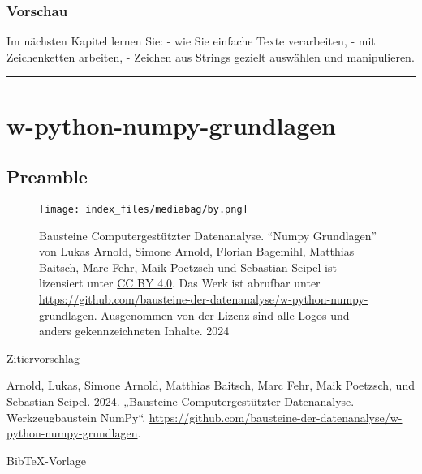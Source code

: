 \documentclass[
  letterpaper,
  DIV=11,
  numbers=noendperiod]{scrreprt}
\begin{document}
\begin{tcolorbox}
\section{Vorschau}\label{vorschau-1}

Im nächsten Kapitel lernen Sie: - wie Sie einfache Texte verarbeiten, -
mit Zeichenketten arbeiten, - Zeichen aus Strings gezielt auswählen und
manipulieren.

\begin{center}\rule{0.5\linewidth}{0.5pt}\end{center}

\part{w-python-numpy-grundlagen}

\chapter*{Preamble}\label{preamble}


\label{Lizenz}
\begin{figure}

\begin{minipage}{0.20\linewidth}
\texttt{[image: index\_files/mediabag/by.png]}\end{minipage}%
%
\begin{minipage}{0.80\linewidth}
Bausteine Computergestützter Datenanalyse. ``Numpy Grundlagen'' von
Lukas Arnold, Simone Arnold, Florian Bagemihl, Matthias Baitsch, Marc
Fehr, Maik Poetzsch und Sebastian Seipel ist lizensiert unter
\href{https://creativecommons.org/licenses/by/4.0/deed.de}{CC BY 4.0}.
Das Werk ist abrufbar unter
\url{https://github.com/bausteine-der-datenanalyse/w-python-numpy-grundlagen}.
Ausgenommen von der Lizenz sind alle Logos und anders gekennzeichneten
Inhalte. 2024\end{minipage}%

\end{figure}%

Zitiervorschlag

Arnold, Lukas, Simone Arnold, Matthias Baitsch, Marc Fehr, Maik
Poetzsch, und Sebastian Seipel. 2024. „Bausteine Computergestützter
Datenanalyse. Werkzeugbaustein NumPy``.
\url{https://github.com/bausteine-der-datenanalyse/w-python-numpy-grundlagen}.

BibTeX-Vorlage


\end{tcolorbox}
\end{document}
